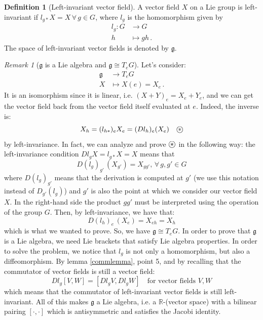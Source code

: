 \documentclass[a4paper,11pt,titlepage, article, oneside]{memoir}
\numberwithin{equation}{section}
\theoremstyle{definition}
\newtheorem{definition}[theorem]{Definition}
\theoremstyle{remark}
\newtheorem{remark}[theorem]{Remark}
\newcommand{\rfield}{\mathbb{R}}
\newcommand{\lie}[1]{\mathfrak{#1}}
\newcommand\oast{\stackMath\mathbin{\stackinset{c}{0ex}{c}{0ex}{\ast}{\bigcirc}}}
\begin{document}
\begin{definition}[Left-invariant vector field]
A vector field $X$ on a Lie group is left-invariant if $l_{g*}X = X\, \forall \, g \in G$, where $l_g$ is the homomorphism given by
\begin{align}
l_g \colon G &\rightarrow G \\
h &\mapsto gh \, . \nonumber
\end{align}
The space of left-invariant vector fields is denoted by $\lie{g}$. 
\end{definition}

\begin{remarkbox} \begin{remark}[$\lie{g}$ is a Lie algebra and $\lie{g} \cong T_eG$]
Let's consider:
\begin{align}
\lie{g} &\rightarrow T_e G \\
X &\mapsto X(e) = X_e \, . \nonumber
\end{align}
It is an isomorphism since it is linear, i.e. $(X + Y)_e = X_e + Y_e$, and we can get the vector field back from the vector field itself evaluated at $e$. Indeed, the inverse is:
$$X_h = (l_{h*})_e X_e= (Dl_h)_e(X_e) \quad \oast$$
by left-invariance. In fact, we can analyze and prove $\oast$ in the following way: the left-invariance condition $D l_g X = l_{g*}X = X$ means that 
$$D(l_g)_{g'}\, (X_{g'}) = X_{g g'}, \, \forall\, g, g' \in G$$
where $D(l_g)_{g'}$ means that the derivation is computed at $g'$ (we use this notation instead of $D_{g'}(l_g)$) and $g'$ is also the point at which we consider our vector field $X$. In the right-hand side the product $gg'$ must be interpreted using the operation of the group $G$. Then, by left-invariance, we have that:
$$D(l_h)_e\, (X_e) = X_{e h} = X_h$$
which is what we wanted to prove.
So, we have $\lie{g} \cong T_e G$. In order to prove that $\lie{g}$ is a Lie algebra, we need Lie brackets that satisfy Lie algebra properties. In order to solve the problem, we notice that $l_g$ is not only a homomorphism, but also a diffeomorphism. By lemma \ref{commlemma}, point 5, and by recalling that the commutator of vector fields is still a vector field:
$$Dl_g [V, W] = [Dl_g V, Dl_g W] \quad \text{for vector fields } V, W$$
which means that the commutator of left-invariant vector fields is still left-invariant.
All of this makes $\lie{g}$ a Lie algebra, i.e. a $\rfield$-(vector space) with a bilinear pairing $[\cdot, \cdot]$ which is antisymmetric and satisfies the Jacobi identity.
\end{remark} \end{remarkbox}
\end{document}

